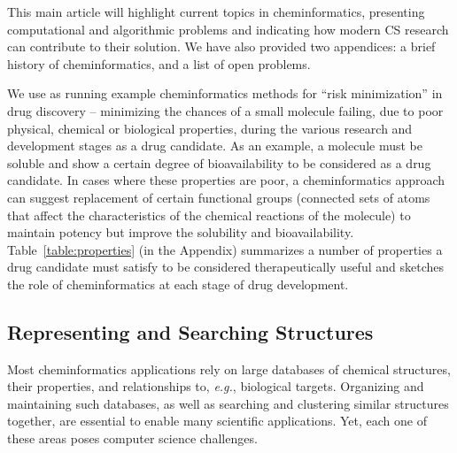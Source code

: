\documentclass{../sig-alternate}
\begin{document}
This main article will highlight current topics in
cheminformatics, presenting computational and algorithmic problems
and indicating how modern CS research can contribute to their
solution.  We have also provided two appendices: a brief history of 
cheminformatics, and a list of open problems.

We use as running example cheminformatics methods for 
``risk minimization'' in drug
discovery -- minimizing the chances
of a small molecule failing, due to poor physical, chemical or
biological properties, during the various research 
and development stages
as a drug candidate. As an example, a molecule must be soluble
and show a certain degree of bioavailability to be considered as a
drug candidate. In cases where these properties are poor, a
cheminformatics approach can suggest replacement of certain functional
groups (connected
sets of atoms that affect the characteristics of the chemical
reactions of the molecule) 
to maintain potency but improve the solubility and
bioavailability.  Table~\ref{table:properties} (in the Appendix)
summarizes a number of properties a drug candidate must satisfy to be
considered therapeutically useful 
and sketches the role of cheminformatics at each
stage of drug development.
%
\subsection{Representing and Searching Structures}
\label{sec:databases}
%
Most cheminformatics applications rely on large databases of chemical
structures, their properties, and relationships to, \textit{e.g.},
biological targets.  Organizing and maintaining such databases, as
well as searching and clustering similar structures together, are
essential to enable many scientific applications. Yet, each one of
these areas poses computer science challenges.
\end{document}
